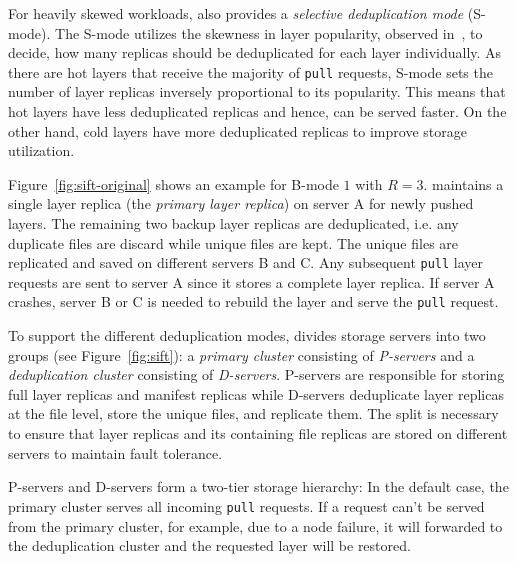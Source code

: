 
For heavily skewed workloads, \sysname also provides a \emph{selective
deduplication mode} (S-mode).
%
The S-mode utilizes the skewness in layer popularity, observed
in~\cite{dockerworkload}, to decide, how many replicas should be deduplicated
for each layer individually.
%
As there are hot layers that receive the majority of \texttt{pull} requests,
S-mode sets the number of layer replicas inversely proportional to its
popularity.
%
This means that hot layers have less deduplicated replicas and
hence, can be served faster.
%
On the other hand, cold layers have more
deduplicated replicas to improve storage utilization.

Figure~\ref{fig:sift-original} shows an example for B-mode $1$ with $R=3$.
\sysname maintains a single layer replica (the \emph{primary layer replica}) on
server A for newly pushed layers.
%
The remaining two backup layer replicas are deduplicated, i.e. any duplicate
files are discard while unique files are kept.  The unique files are replicated
and saved on different servers B and C.
%
Any subsequent \texttt{pull} layer requests are sent to server A since it
stores a complete layer replica.
%
If server A crashes, server B or C is needed to rebuild the layer and serve the
\texttt{pull} request.
%
%

To support the different deduplication modes, \sysname divides storage servers
into two groups (see Figure~\ref{fig:sift}): a \emph{primary cluster}
consisting of \emph{P-servers} and a \emph{deduplication cluster} consisting of
\emph{D-servers}.
%
P-servers are responsible for storing full layer replicas and manifest replicas
while D-servers deduplicate layer replicas at the file level, store the unique
files, and replicate them.
%
The split is necessary to ensure that layer replicas and its containing file
replicas are stored on different servers to maintain fault tolerance.


P-servers and D-servers form a two-tier storage hierarchy: In the default case,
the primary cluster serves all incoming \texttt{pull} requests.
%
If a request can't be served from the primary cluster, for example, due to a
node failure, it will forwarded to the deduplication cluster and the requested
layer will be restored.
%
%





